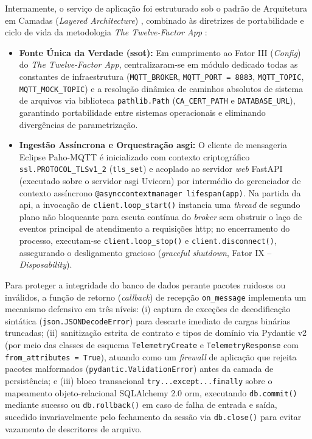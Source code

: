 \documentclass[
	12pt,				%
	openright,			%
	twoside,			%
	a4paper,			%
	english,			%
	brazil				%
	]{abntex2}
\begin{document}
Internamente, o serviço de aplicação foi estruturado sob o padrão de Arquitetura em
Camadas (\textit{Layered Architecture}) \cite{fowler2002}, combinado às diretrizes de
portabilidade e ciclo de vida da metodologia \textit{The Twelve-Factor App}
\cite{wiggins2011}:

\begin{itemize}
    \item \textbf{Fonte Única da Verdade (\acrshort{ssot}):} Em cumprimento ao Fator III
        (\textit{Config}) do \textit{The Twelve-Factor App}, centralizaram-se em módulo
        dedicado todas as constantes de infraestrutura (\texttt{MQTT\_BROKER},
        \texttt{MQTT\_PORT = 8883}, \texttt{MQTT\_TOPIC},
        \texttt{MQTT\_\allowbreak MOCK\_\allowbreak TOPIC}) e a resolução dinâmica de
        caminhos absolutos de sistema de arquivos via biblioteca \texttt{pathlib.Path}
        (\texttt{CA\_CERT\_PATH} e \texttt{DATABASE\_URL}), garantindo portabilidade
        entre sistemas operacionais e eliminando divergências de parametrização.
    \item \textbf{Ingestão Assíncrona e Orquestração \acrshort{asgi}:} O cliente de
        mensageria Eclipse Paho-MQTT é inicializado com contexto criptográfico
        \texttt{ssl.PROTOCOL\_\allowbreak TLSv1\_2} (\texttt{tls\_set}) e acoplado ao
        servidor \textit{web} FastAPI (executado sobre o servidor \acrshort{asgi}
        Uvicorn) por intermédio do gerenciador de contexto assíncrono
        \texttt{@asynccontextmanager lifespan(app)}. Na partida da \acrshort{api}, a
        invocação de \texttt{client.\allowbreak loop\_start()} instancia uma
        \textit{thread} de segundo plano não bloqueante para escuta contínua do
        \textit{broker} sem obstruir o laço de eventos principal de atendimento a
        requisições \acrshort{http}; no encerramento do processo, executam-se
        \texttt{client.\allowbreak loop\_stop()} e
        \texttt{client.\allowbreak disconnect()}, assegurando o desligamento gracioso
        (\textit{graceful shutdown}, Fator IX -- \textit{Disposability}).
\end{itemize}

Para proteger a integridade do banco de dados perante pacotes ruidosos ou inválidos, a
função de retorno (\textit{callback}) de recepção \texttt{on\_message} implementa um
mecanismo defensivo em três níveis: (i) captura de exceções de decodificação sintática
(\texttt{json.\allowbreak JSONDecodeError}) para descarte imediato de cargas binárias
truncadas; (ii) sanitização estrita de contrato e tipos de domínio via Pydantic v2 (por
meio das classes de esquema \texttt{TelemetryCreate} e
\texttt{Telemetry\allowbreak Response} com \texttt{from\_attributes = True}), atuando
como um \textit{firewall} de aplicação que rejeita pacotes malformados
(\texttt{pydantic.\allowbreak ValidationError}) antes da camada de persistência; e (iii)
bloco transacional \texttt{try...except...finally} sobre o mapeamento objeto-relacional
SQLAlchemy 2.0 \acrshort{orm}, executando \texttt{db.commit()} mediante sucesso ou
\texttt{db.rollback()} em caso de falha de entrada e saída, sucedido invariavelmente
pelo fechamento da sessão via \texttt{db.close()} para evitar vazamento de descritores
de arquivo.
\end{document}
